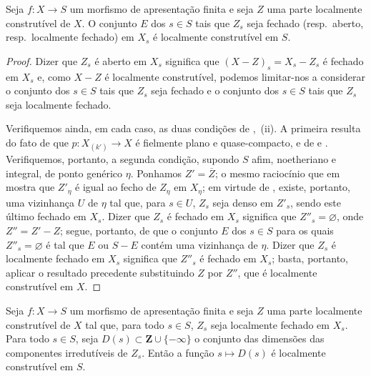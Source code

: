 \begin{corollary}[9.5.4]
\label{IV.9.5.4}
Seja $f:X\to S$ um morfismo de apresentação finita e seja $Z$ uma parte localmente construtível de $X$.
O conjunto $E$ dos $s\in S$ tais que $Z_s$ seja fechado \textnormal{(}resp.\ aberto, resp.\ localmente fechado\textnormal{)} em $X_s$ é localmente construtível em $S$.
\end{corollary}

\begin{proof}
Dizer que $Z_s$ é aberto em $X_s$ significa que $(X-Z)_s=X_s-Z_s$ é fechado em $X_s$ e, como $X-Z$ é localmente construtível, podemos limitar-nos a considerar o conjunto dos $s\in S$ tais que $Z_s$ seja fechado e o conjunto dos $s\in S$ tais que $Z_s$ seja localmente fechado.

Verifiquemos ainda, em cada caso, as duas condições de ,~(ii).
A primeira resulta do fato de que $p:X_{(k')}\to X$ é fielmente plano e quase-compacto, e de  e .
Verifiquemos, portanto, a segunda condição, supondo $S$ afim, noetheriano e integral, de ponto genérico $\eta$.
Ponhamos $Z'=\overline{Z}$; o mesmo raciocínio que em  mostra que $Z'_\eta$ é igual ao fecho de $Z_\eta$ em $X_\eta$; em virtude de , existe, portanto, uma vizinhança $U$ de $\eta$ tal que, para $s\in U$, $Z_s$ seja denso em $Z'_s$, sendo este último fechado em $X_s$.
Dizer que $Z_s$ é fechado em $X_s$ significa que $Z''_s=\varnothing$, onde $Z''=Z'-Z$; segue, portanto, de  que o conjunto $E$ dos $s\in S$ para os quais $Z''_s=\varnothing$ é tal que $E$ ou $S-E$ contém uma vizinhança de $\eta$.
Dizer que $Z_s$ é localmente fechado em $X_s$ significa que $Z''_s$ é fechado em $X_s$; basta, portanto, aplicar o resultado precedente substituindo $Z$ por $Z''$, que é localmente construtível em $X$.
\end{proof}


\begin{proposition}[9.5.5]
\label{IV.9.5.5}
Seja $f:X\to S$ um morfismo de apresentação finita e seja $Z$ uma parte localmente construtível de $X$ tal que, para todo $s\in S$, $Z_s$ seja localmente fechado em $X_s$.
Para todo $s\in S$, seja $D(s)\subset\mathbf{Z}\cup\{-\infty\}$ o conjunto das dimensões das componentes irredutíveis de $Z_s$.
Então a função $s\mapsto D(s)$ é localmente construtível em $S$.
\end{proposition}

